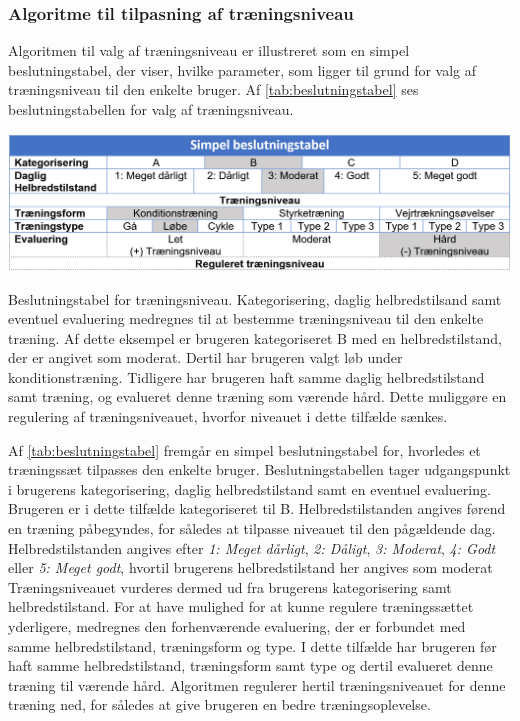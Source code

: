 \subsubsection*{Algoritme til tilpasning af træningsniveau}
Algoritmen til valg af træningsniveau er illustreret som en simpel beslutningstabel, der viser, hvilke parameter, som ligger til grund for valg af træningsniveau til den enkelte bruger. Af \autoref{tab:beslutningstabel} ses beslutningstabellen for valg af træningsniveau.

\begin{table}[H]
\centering
\includegraphics[width=1\textwidth]{figures/aktivitetsdiagram/beslutningstabel}
\caption{Beslutningstabel for træningsniveau. Kategorisering, daglig helbredstilsand samt eventuel evaluering medregnes til at bestemme træningsniveau til den enkelte træning. Af dette eksempel er brugeren kategoriseret B med en helbredstilstand, der er angivet som moderat. Dertil har brugeren valgt løb under konditionstræning. Tidligere har brugeren haft samme daglig helbredstilstand samt træning, og evalueret denne træning som værende hård. Dette muliggøre en regulering af træningsniveauet, hvorfor niveauet i dette tilfælde sænkes.}
\label{tab:beslutningstabel}
\end{table} 

\noindent
Af \autoref{tab:beslutningstabel} fremgår en simpel beslutningstabel for, hvorledes et træningssæt tilpasses den enkelte bruger. Beslutningstabellen tager udgangspunkt i brugerens kategorisering, daglig helbredstilstand samt en eventuel evaluering. Brugeren er i dette tilfælde kategoriseret til B. Helbredstilstanden angives førend en træning påbegyndes, for således at tilpasse niveauet til den pågældende dag. Helbredstilstanden angives efter \textit{1: Meget dårligt}, \textit{2: Dåligt}, \textit{3: Moderat}, \textit{4: Godt} eller \textit{5: Meget godt}, hvortil brugerens helbredstilstand her angives som moderat
Træningsniveauet vurderes dermed ud fra brugerens kategorisering samt helbredstilstand. 
For at have mulighed for at kunne regulere træningssættet yderligere, medregnes den forhenværende evaluering, der er forbundet med samme helbredstilstand, træningsform og type. I dette tilfælde har brugeren før haft samme helbredstilstand, træningsform samt type og dertil evalueret denne træning til værende hård. Algoritmen regulerer hertil træningsniveauet for denne træning ned, for således at give brugeren en bedre træningsoplevelse. 
